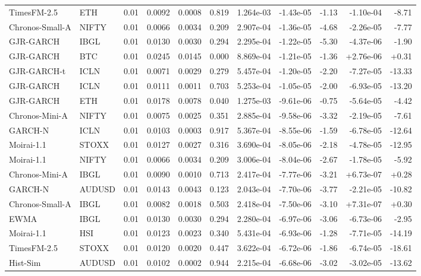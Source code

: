 \begin{tabular}{llrrrrrrrrr}
TimesFM-2.5 & ETH & 0.01 & 0.0092 & 0.0008 & 0.819 & 1.264e-03 & -1.43e-05 & -1.13 & -1.10e-04 & -8.71 \\
Chronos-Small-A & NIFTY & 0.01 & 0.0066 & 0.0034 & 0.209 & 2.907e-04 & -1.36e-05 & -4.68 & -2.26e-05 & -7.77 \\
GJR-GARCH & IBGL & 0.01 & 0.0130 & 0.0030 & 0.294 & 2.295e-04 & -1.22e-05 & -5.30 & -4.37e-06 & -1.90 \\
GJR-GARCH & BTC & 0.01 & 0.0245 & 0.0145 & 0.000 & 8.869e-04 & -1.21e-05 & -1.36 & +2.76e-06 & +0.31 \\
GJR-GARCH-t & ICLN & 0.01 & 0.0071 & 0.0029 & 0.279 & 5.457e-04 & -1.20e-05 & -2.20 & -7.27e-05 & -13.33 \\
GJR-GARCH & ICLN & 0.01 & 0.0111 & 0.0011 & 0.703 & 5.253e-04 & -1.05e-05 & -2.00 & -6.93e-05 & -13.20 \\
GJR-GARCH & ETH & 0.01 & 0.0178 & 0.0078 & 0.040 & 1.275e-03 & -9.61e-06 & -0.75 & -5.64e-05 & -4.42 \\
Chronos-Mini-A & NIFTY & 0.01 & 0.0075 & 0.0025 & 0.351 & 2.885e-04 & -9.58e-06 & -3.32 & -2.19e-05 & -7.61 \\
GARCH-N & ICLN & 0.01 & 0.0103 & 0.0003 & 0.917 & 5.367e-04 & -8.55e-06 & -1.59 & -6.78e-05 & -12.64 \\
Moirai-1.1 & STOXX & 0.01 & 0.0127 & 0.0027 & 0.316 & 3.690e-04 & -8.05e-06 & -2.18 & -4.78e-05 & -12.95 \\
Moirai-1.1 & NIFTY & 0.01 & 0.0066 & 0.0034 & 0.209 & 3.006e-04 & -8.04e-06 & -2.67 & -1.78e-05 & -5.92 \\
Chronos-Mini-A & IBGL & 0.01 & 0.0090 & 0.0010 & 0.713 & 2.417e-04 & -7.77e-06 & -3.21 & +6.73e-07 & +0.28 \\
GARCH-N & AUDUSD & 0.01 & 0.0143 & 0.0043 & 0.123 & 2.043e-04 & -7.70e-06 & -3.77 & -2.21e-05 & -10.82 \\
Chronos-Small-A & IBGL & 0.01 & 0.0082 & 0.0018 & 0.503 & 2.418e-04 & -7.50e-06 & -3.10 & +7.31e-07 & +0.30 \\
EWMA & IBGL & 0.01 & 0.0130 & 0.0030 & 0.294 & 2.280e-04 & -6.97e-06 & -3.06 & -6.73e-06 & -2.95 \\
Moirai-1.1 & HSI & 0.01 & 0.0123 & 0.0023 & 0.340 & 5.431e-04 & -6.93e-06 & -1.28 & -7.71e-05 & -14.19 \\
TimesFM-2.5 & STOXX & 0.01 & 0.0120 & 0.0020 & 0.447 & 3.622e-04 & -6.72e-06 & -1.86 & -6.74e-05 & -18.61 \\
Hist-Sim & AUDUSD & 0.01 & 0.0102 & 0.0002 & 0.944 & 2.215e-04 & -6.68e-06 & -3.02 & -3.02e-05 & -13.62 \\

\end{tabular}
